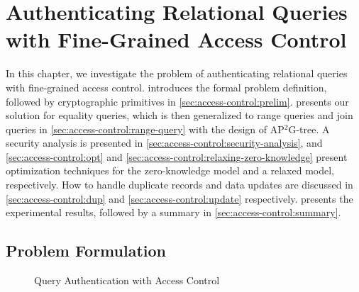 \chapter{Authenticating Relational Queries with Fine-Grained Access Control}\label{chap:access-control}

In this chapter, we investigate the problem of authenticating relational queries with fine-grained access control.  introduces the formal problem definition, followed by cryptographic primitives in \cref{sec:access-control:prelim}.  presents our solution for equality queries, which is then generalized to range queries and join queries in \cref{sec:access-control:range-query} with the design of AP$^2$G-tree. A security analysis is presented in \cref{sec:access-control:security-analysis}, and \cref{sec:access-control:opt} and \cref{sec:access-control:relaxing-zero-knowledge} present optimization techniques for the zero-knowledge model and a relaxed model, respectively. How to handle duplicate records and data updates are discussed in \cref{sec:access-control:dup} and \cref{sec:access-control:update} respectively.  presents the experimental results, followed by a summary in \cref{sec:access-control:summary}.

\section{Problem Formulation}\label{sec:access-control:problem}

\begin{figure}[t]
  \centering
  \resizebox{\linewidth}{!}{}
  \caption{Query Authentication with Access Control}\label{fig:access-control:model}
\end{figure}

